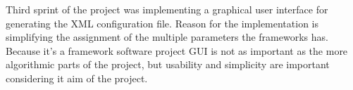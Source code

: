Third sprint of the project was implementing a graphical user interface for generating the XML configuration file.
Reason for the implementation is simplifying the assignment of the multiple parameters the frameworks has. Because
it's a framework software project GUI is not as important as the more algorithmic parts of the project, but usability
and simplicity are important considering it aim of the project.